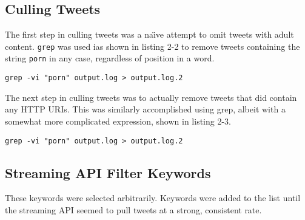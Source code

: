\documentclass[a4paper,12pt]{article}
\begin{document}
\subsection{Culling Tweets}
The first step in culling tweets was a na\"{\i}ve attempt to omit tweets with adult content. \texttt{grep}
was used ias shown in listing 2-2 to remove tweets containing the string \texttt{porn} in any case,
regardless of position in a word.
\begin{lstlisting}[basicstyle=\ttfamily,caption={Removing Naughty Tweets}]
    grep -vi "porn" output.log > output.log.2
\end{lstlisting}
The next step in culling tweets was to actually remove tweets that did contain any HTTP URIs. This was
similarly accomplished using grep, albeit with a somewhat more complicated expression, shown in listing 2-3.
\begin{lstlisting}[basicstyle=\ttfamily,caption={Removing Tweets}]
    grep -vi "porn" output.log > output.log.2
\end{lstlisting}








\begin{appendices}

\section{Streaming API Filter Keywords}
These keywords were selected arbitrarily. Keywords were added to the list until the streaming API seemed to pull tweets at a strong, consistent rate.

\end{appendices}
\end{document}
